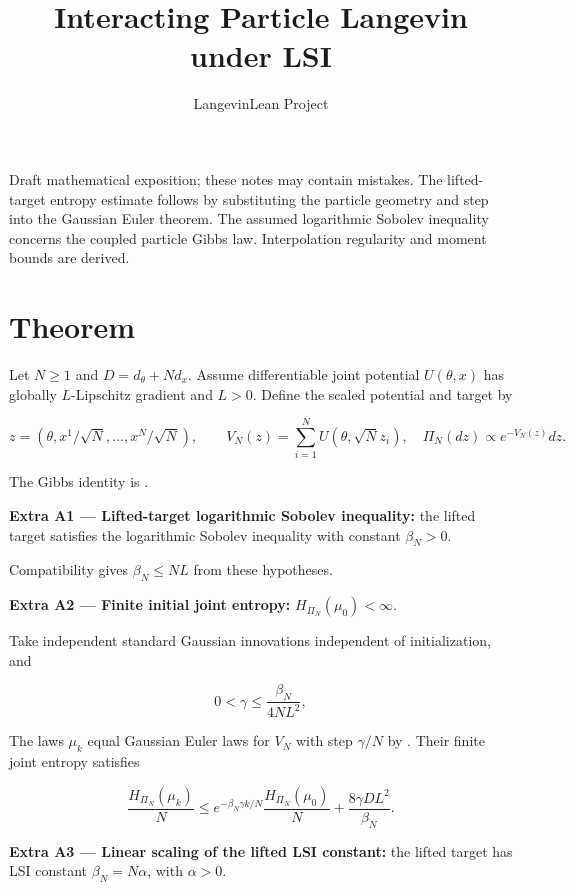 \documentclass[11pt,a4paper]{article}
\title{\texorpdfstring{Interacting Particle Langevin under LSI}{Interacting Particle Langevin under LSI}}
\author{LangevinLean Project}
\date{}
\begin{document}
\maketitle
Draft mathematical exposition; these notes may contain mistakes.
The lifted-target entropy estimate follows by substituting the particle geometry and step into the Gaussian Euler theorem. The assumed logarithmic Sobolev inequality concerns the coupled particle Gibbs law. Interpolation regularity and moment bounds are derived.
\section{\texorpdfstring{Theorem}{Theorem}}


Let \(N\ge1\) and \(D=d_\theta+Nd_x\). Assume differentiable joint potential \(U(\theta,x)\) has globally \(L\)-Lipschitz gradient and \(L>0\). Define the scaled potential and target by

\[z=(\theta,x^1/\sqrt N,\ldots,x^N/\sqrt N),\qquad
V_N(z)=\sum_{i=1}^NU(\theta,\sqrt N z_i),\quad
\Pi_N(dz)\propto e^{-V_N(z)}dz.\]

The Gibbs identity is \cite[Section~3.5.1]{LangevinLean2026IPLA}.



\textbf{Extra A1 — Lifted-target logarithmic Sobolev inequality:} the lifted target satisfies the logarithmic Sobolev inequality with constant \(\beta_N>0\).



Compatibility \cite[Section~3.6.9]{LangevinLean2026ULALSI} gives \(\beta_N\le NL\) from these hypotheses.



\textbf{Extra A2 — Finite initial joint entropy:} \(H_{\Pi_N}(\mu_0)<\infty\).



Take independent standard Gaussian innovations independent of initialization, and

\[0<\gamma\le\frac{\beta_N}{4NL^2},\]

The laws \(\mu_k\) equal Gaussian Euler laws for \(V_N\) with step \(\gamma/N\) by \cite[Section~3.16.3]{LangevinLean2026IPLA}. Their finite joint entropy satisfies

\[\frac{H_{\Pi_N}(\mu_k)}N\le
e^{-\beta_N\gamma k/N}\frac{H_{\Pi_N}(\mu_0)}N
+\frac{8\gamma DL^2}{\beta_N}.\]

\textbf{Extra A3 — Linear scaling of the lifted LSI constant:} the lifted target has LSI constant \(\beta_N=N\alpha\), with \(\alpha>0\).
\end{document}
